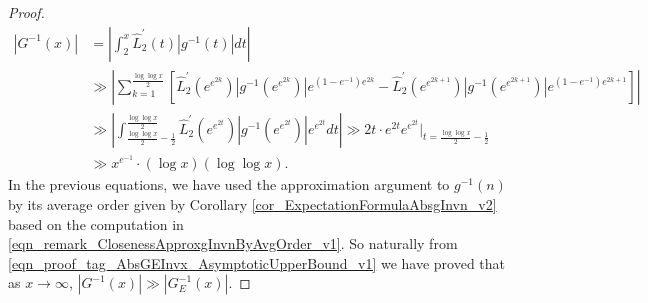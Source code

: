 \documentclass[11pt,reqno,a4letter]{article}
\numberwithin{figure}{section}
\numberwithin{table}{section}
\theoremstyle{plain}
\numberwithin{theorem}{section}
\theoremstyle{definition}
\begin{document}
\begin{proof}
\begin{align*} 
|G^{-1}(x)| & = \left\lvert \int_2^x \widehat{L}_2^{\prime}(t) |g^{-1}(t)| dt \right\rvert \\ 
     & \gg \left\lvert \sum_{k=1}^{\frac{\log\log x}{2}} \left[ 
     \widehat{L}_2^{\prime}\left(e^{e^{2k}}\right) \left\lvert g^{-1}\left(e^{e^{2k}}\right) \right\rvert 
     e^{(1-e^{-1})e^{2k}} - 
     \widehat{L}_2^{\prime}\left(e^{e^{2k+1}}\right) \left\lvert g^{-1}\left(e^{e^{2k+1}}\right) \right\rvert 
     e^{(1-e^{-1})e^{2k+1}}\right] \right\rvert \\ 
     & \gg \left\lvert \int_{\frac{\log\log x}{2} - \frac{1}{2}}^{\frac{\log\log x}{2}} 
     \widehat{L}_2^{\prime}\left(e^{e^{2t}}\right) \left\lvert g^{-1}\left(e^{e^{2t}}\right) \right\rvert 
     e^{e^{2t}} dt \right\rvert 
     \gg 2t \cdot e^{2t} e^{e^{2t}} \Biggr\rvert_{t=\frac{\log\log x}{2} - \frac{1}{2}} \\ 
     & \gg x^{e^{-1}} \cdot (\log x) (\log\log x). 
\end{align*} 
In the previous equations, we have used the approximation argument to $g^{-1}(n)$ by its average order 
given by Corollary \ref{cor_ExpectationFormulaAbsgInvn_v2} 
based on the computation in \eqref{eqn_remark_ClosenessApproxgInvnByAvgOrder_v1}. 
So naturally from \eqref{eqn_proof_tag_AbsGEInvx_AsymptoticUpperBound_v1} we 
have proved that as $x \rightarrow \infty$, 
$|G^{-1}(x)| \gg |G_E^{-1}(x)|$. 
\end{proof} 
\end{document}

